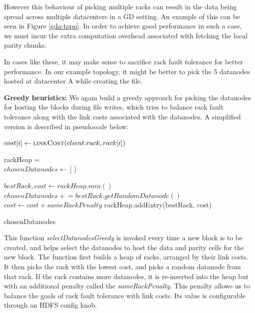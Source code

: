 \documentclass{sig-alternate-05-2015}
\newcommand{\pluseq}{\mathrel{+}=}
\begin{document}
However this behaviour of picking multiple racks can result in the data being spread across multiple datacenters in a GD setting. An example of this can be seen in Figure \ref{gda-topo}. In order to achieve good performance in such a case, we must incur the extra computation overhead associated with fetching the local parity chunks.

In cases like these, it may make sense to sacrifice rack fault tolerance for better performance. In our example topology, it might be better to pick the 5 datanodes hosted at datacenter A while creating the file. 

\textbf{Greedy heuristics:} We again build a greedy approach for picking the datanodes for hosting the blocks during file writes, which tries to balance rack fault tolerance along with the link costs associated with the datanodes. A simplified version is described in pseudocode below:

\vspace{0.5em}
\begin{algorithmic}
  \State $cost[i]\gets \Call{linkCost}{client.rack, rack[i]}$
\EndFor

rackHeap =  
\\
\State $chosenDatanodes \gets []$

  \State $bestRack, cost\gets rackHeap.min()$
  \State $chosenDatanodes \pluseq bestRack.getRandomDatanode()$
      \State $cost \gets cost + sameRackPenalty$
      \State rackHeap.addEntry(bestRack, cost)
  \EndIf 
\EndWhile

\Return chosenDatanodes
\EndFunction
\end{algorithmic}

\vspace{0.5em}
This function \emph{selectDatanodesGreedy} is invoked every time a new block is to be created, and helps select the datanodes to host the data and parity cells for the new block. The function first builds a heap of racks, arranged by their link costs. It then picks the rack with the lowest cost, and picks a random datanode from that rack. If the rack contains more datanodes, it is re-inserted into the heap but with an additional penalty called the \emph{sameRackPenalty}. This penalty allows us to balance the goals of rack fault tolerance with link costs. Its value is configurable through an HDFS config knob. 
\end{document}
